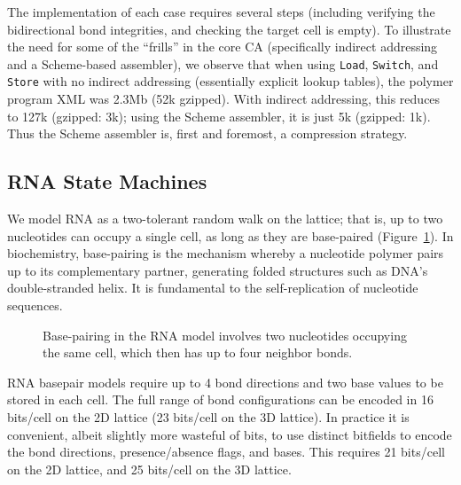 \documentclass{acm_proc_article-sp}
\begin{document}
The implementation of each case requires several steps (including verifying the bidirectional bond integrities,
and checking the target cell is empty).
To illustrate the need for some of the ``frills'' in the core CA
(specifically indirect addressing and a Scheme-based assembler),
we observe that when using {\tt Load}, {\tt Switch}, and {\tt Store} with no indirect addressing
(essentially explicit lookup tables), the polymer program XML was 2.3Mb (52k gzipped).
With indirect addressing, this reduces to 127k (gzipped: 3k);
using the Scheme assembler, it is just 5k (gzipped: 1k).
Thus the Scheme assembler is, first and foremost, a compression strategy.

\subsection{RNA State Machines}

We model RNA as a two-tolerant random walk on the lattice\cite{LeoniVanderzande2003};
that is, up to two nucleotides can occupy a single cell, as long as they are base-paired
(Figure~\ref{fig:rna}).
In biochemistry, base-pairing is the mechanism whereby a nucleotide polymer pairs up to
its complementary partner, generating folded structures such as DNA's double-stranded helix.
It is fundamental to the self-replication of nucleotide sequences.

\begin{figure}
\caption{
\label{fig:rna}
Base-pairing in the RNA model involves two nucleotides occupying the same cell, which then has up to four neighbor bonds.
}
\end{figure}

RNA basepair models require up to 4 bond directions and two base values to be stored in each cell.
The full range of bond configurations can be encoded in 16 bits/cell on the 2D lattice (23 bits/cell on the 3D lattice).
In practice it is convenient, albeit slightly more wasteful of bits,
to use distinct bitfields to encode the bond directions, presence/absence flags, and bases.
This requires 21 bits/cell on the 2D lattice, and 25 bits/cell on the 3D lattice.
\end{document}
